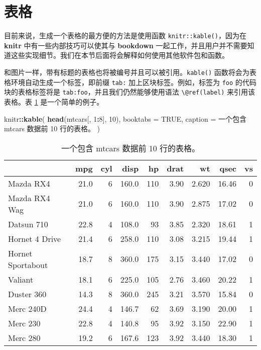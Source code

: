 \documentclass[
  12pt,
]{krantz}
\newenvironment{Shaded}{\begin{snugshade}}{\end{snugshade}}
\newcommand{\AttributeTok}[1]{\textcolor[rgb]{0.13,0.29,0.53}{#1}}
\newcommand{\ConstantTok}[1]{\textcolor[rgb]{0.56,0.35,0.01}{#1}}
\newcommand{\DecValTok}[1]{\textcolor[rgb]{0.00,0.00,0.81}{#1}}
\newcommand{\FunctionTok}[1]{\textcolor[rgb]{0.13,0.29,0.53}{\textbf{#1}}}
\newcommand{\NormalTok}[1]{#1}
\newcommand{\SpecialCharTok}[1]{\textcolor[rgb]{0.81,0.36,0.00}{\textbf{#1}}}
\newcommand{\StringTok}[1]{\textcolor[rgb]{0.31,0.60,0.02}{#1}}
\theoremstyle{definition}
\theoremstyle{definition}
\theoremstyle{definition}
\theoremstyle{definition}
\theoremstyle{remark}
\begin{document}
\section{表格}\label{tables}

目前来说，生成一个表格的最方便的方法是使用函数 \texttt{knitr::kable()}，因为在 \textbf{knitr} 中有一些内部技巧可以使其与 \textbf{bookdown} 一起工作，并且用户并不需要知道这些实现细节。我们在本节后面将会解释如何使用其他软件包和函数。

和图片一样，带有标题的表格也将被编号并且可以被引用。\texttt{kable()} 函数将会为表格环境自动生成一个标签，即前缀 \texttt{tab:} 加上区块标签。例如，标签为 \texttt{foo} 的代码块的表格标签将是 \texttt{tab:foo}，并且我们仍然能够使用语法 \texttt{\textbackslash{}@ref(label)} 来引用该表格。表 \ref{tab:table-single} 是一个简单的例子。

\begin{Shaded}
\begin{Highlighting}[]
\NormalTok{knitr}\SpecialCharTok{::}\FunctionTok{kable}\NormalTok{(}
  \FunctionTok{head}\NormalTok{(mtcars[, }\DecValTok{1}\SpecialCharTok{:}\DecValTok{8}\NormalTok{], }\DecValTok{10}\NormalTok{), }\AttributeTok{booktabs =} \ConstantTok{TRUE}\NormalTok{,}
  \AttributeTok{caption =} \StringTok{\textquotesingle{}一个包含 mtcars 数据前 10 行的表格。\textquotesingle{}}
\NormalTok{)}
\end{Highlighting}
\end{Shaded}

\begin{table}

\caption{\label{tab:table-single}一个包含 mtcars 数据前 10 行的表格。}
\centering
\begin{tabular}[t]{lrrrrrrrr}
\toprule
  & mpg & cyl & disp & hp & drat & wt & qsec & vs\\
\midrule
Mazda RX4 & 21.0 & 6 & 160.0 & 110 & 3.90 & 2.620 & 16.46 & 0\\
Mazda RX4 Wag & 21.0 & 6 & 160.0 & 110 & 3.90 & 2.875 & 17.02 & 0\\
Datsun 710 & 22.8 & 4 & 108.0 & 93 & 3.85 & 2.320 & 18.61 & 1\\
Hornet 4 Drive & 21.4 & 6 & 258.0 & 110 & 3.08 & 3.215 & 19.44 & 1\\
Hornet Sportabout & 18.7 & 8 & 360.0 & 175 & 3.15 & 3.440 & 17.02 & 0\\
\addlinespace
Valiant & 18.1 & 6 & 225.0 & 105 & 2.76 & 3.460 & 20.22 & 1\\
Duster 360 & 14.3 & 8 & 360.0 & 245 & 3.21 & 3.570 & 15.84 & 0\\
Merc 240D & 24.4 & 4 & 146.7 & 62 & 3.69 & 3.190 & 20.00 & 1\\
Merc 230 & 22.8 & 4 & 140.8 & 95 & 3.92 & 3.150 & 22.90 & 1\\
Merc 280 & 19.2 & 6 & 167.6 & 123 & 3.92 & 3.440 & 18.30 & 1\\
\bottomrule
\end{tabular}
\end{table}
\end{document}
